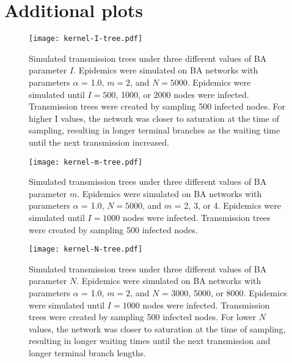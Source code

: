 

\chapter{Additional plots}

\begin{figure}[ht]
  \centering
  \texttt{[image: kernel-I-tree.pdf]}
  \caption[Simulated transmission trees under three different values of BA parameter $I$]{
    Simulated transmission trees under three different values of BA parameter
    $I$. Epidemics were simulated on \gls{BA} networks with parameters $\alpha$
    = 1.0, $m = 2$, and $N = 5000$. Epidemics were simulated until $I = 500$,
    1000, or 2000 nodes were infected. Transmission trees were created by
    sampling 500 infected nodes. For higher \gls{I} values, the network was
    closer to saturation at the time of sampling, resulting in longer terminal
    branches as the waiting time until the next transmission increased.
  }
  \label{fig:Itrees}
\end{figure}

\begin{figure}[ht]
  \centering
  \texttt{[image: kernel-m-tree.pdf]}
  \caption[Simulated transmission trees under three different values of BA parameter $m$]{
    Simulated transmission trees under three different values of BA parameter
    $m$. Epidemics were simulated on \gls{BA} networks with parameters $\alpha$
    = 1.0, $N = 5000$, and $m$ = 2, 3, or 4. Epidemics were simulated until $I
    = 1000$ nodes were infected. Transmission trees were created by sampling
    500 infected nodes.
  }
  \label{fig:mtrees}
\end{figure}

\begin{figure}[ht]
  \centering
  \texttt{[image: kernel-N-tree.pdf]}
  \caption[Simulated transmission trees under three different values of BA parameter $N$]{
    Simulated transmission trees under three different values of BA parameter
    $N$. Epidemics were simulated on \gls{BA} networks with parameters $\alpha$
    = 1.0, $m = 2$, and $N$ = 3000, 5000, or 8000. Epidemics were simulated
    until $I = 1000$ nodes were infected. Transmission trees were created by
    sampling 500 infected nodes. For lower $N$ values, the network was closer
    to saturation at the time of sampling, resulting in longer waiting times
    until the next transmission and longer terminal branch lengths.
  }
  \label{fig:Ntrees}
\end{figure}

